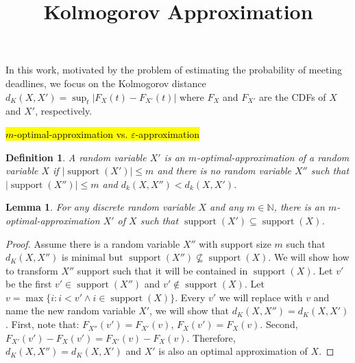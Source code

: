 \documentclass{article}
\title{Kolmogorov Approximation}
\newtheorem{lemma}[thm]{Lemma}
\newtheorem{definition}[thm]{Definition}
\DeclareMathOperator{\support}{support}
\begin{document}

\maketitle
In this work, motivated by the problem of estimating the probability of meeting deadlines, we focus on the Kolmogorov distance $d_K(X,X')= \sup_t |F_X(t) - F_{X'}(t)|$ where $F_X$ and $F_{X'}$ are the CDFs of $X$ and $X'$, respectively.

\hl{$m$-optimal-approximation vs. $\varepsilon$-approximation}
\begin{definition}
A random variable $X'$ is an $m$-optimal-approximation of a random variable $X$ if $|\support(X')| \leq m$ and there is no random variable $X''$ such that $|\support(X'')| \leq m$ and $d_k(X,X'') < d_k(X,X')$.
\end{definition}

%

\begin{lemma}
	For any discrete random variable $X$ and any $m \in \mathbb{N}$, there is an $m$-optimal-approximation $X'$ of $X$ such that $\support(X') \subseteq \support(X)$.
\end{lemma}
\begin{proof}
Assume there is a random variable $X''$ with support size $m$ such that $d_K(X,X'')$ is minimal but $\support(X'')\nsubseteq\support(X)$.
We will show how to transform $X''$ support such that it will be contained in $\support(X)$. Let $v'$ be the first $v'\in\support(X'')$ and $v' \not\in\support(X)$. Let $v=\max\{i: i<v' \wedge i\in\support(X)\}$. Every $v'$ we will replace with $v$ and name the new random variable $X'$, we will show that $d_K(X,X'') = d_K(X,X')$. First, note that:
$F_{X''}(v')=F_{X'}(v)$, $F_{X}(v')=F_{X}(v)$.
Second,  $F_{X'}(v')-F_{X}(v') = F_{X'}(v)-F_{X}(v)$. Therefore, $d_K(X,X'') = d_K(X,X')$ and $X'$ is also an optimal approximation of $X$.
\end{proof}
\end{document}
